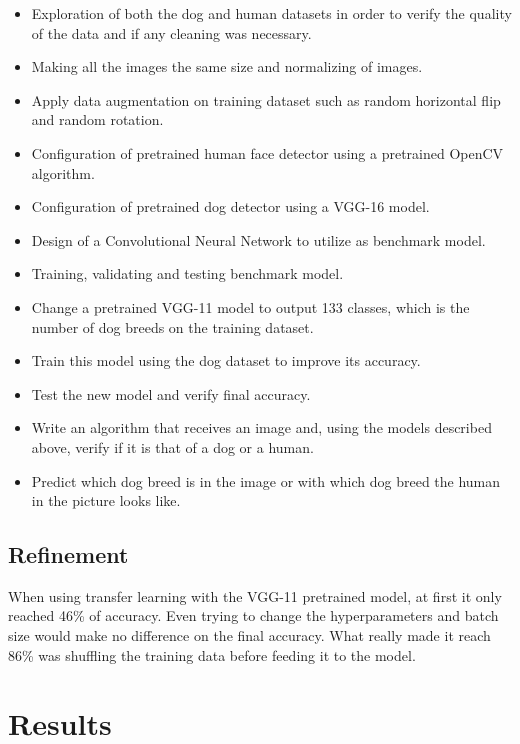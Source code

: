 \documentclass{article}
\begin{document}
    \begin{itemize}
        \item Exploration of both the dog and human datasets in order to verify the quality of the data and if any cleaning was necessary.
        \item Making all the images the same size and normalizing of images.
        \item Apply data augmentation on training dataset such as random horizontal flip and random rotation.
        \item Configuration of pretrained human face detector using a pretrained OpenCV algorithm.
        \item Configuration of pretrained dog detector using a VGG-16 model.
        \item Design of a Convolutional Neural Network to utilize as benchmark model.
        \item Training, validating and testing benchmark model.
        \item Change a pretrained VGG-11 model to output 133 classes, which is the number of dog breeds on the training dataset.
        \item Train this model using the dog dataset to improve its accuracy.
        \item Test the new model and verify final accuracy.
        \item Write an algorithm that receives an image and, using the models described above, verify if it is that of a dog or a human.
        \item Predict which dog breed is in the image or with which dog breed the human in the picture looks like.
    \end{itemize}

    \subsection{Refinement}

    When using transfer learning with the VGG-11 pretrained model, at first it only reached 46\% of accuracy. Even trying to change the hyperparameters and batch size would make no difference on the final accuracy. What really made it reach 86\% was shuffling the training data before feeding it to the model.

    \section{Results}
\end{document}
